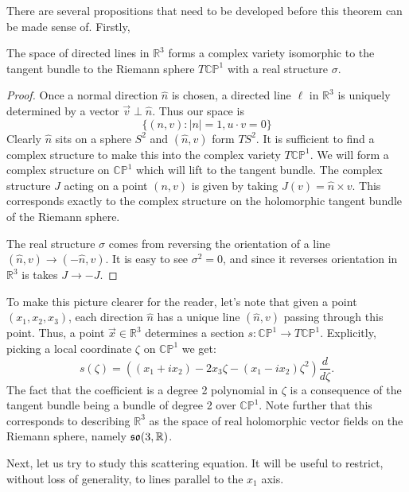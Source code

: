 	There are several propositions that need to be developed before this theorem can be made sense of. Firstly, 
	\begin{prop}
		The space of directed lines in $\mathbb R^3$ forms a complex variety isomorphic to the tangent bundle to the Riemann sphere $T \mathbb{CP}^1$ with a real structure $\sigma$.
	\end{prop}
	\begin{proof}
		Once a normal direction $\hat n$ is chosen, a directed line $\ell$ in $\mathbb R^3$ is uniquely determined by a vector $\vec v \perp \hat n$. Thus our space is
		\begin{equation}
			\{ (n, v) : |n| = 1, u \cdot v = 0\}
		\end{equation}
		Clearly $\hat n$ sits on a sphere $S^2$ and $(\hat n, v)$ form $T S^2$. It is sufficient to find a complex structure to make this into the complex variety $T \mathbb{CP}^1$. We will form a complex structure on $\mathbb{CP}^1$ which will lift to the tangent bundle. 
		The complex structure $J$ acting on a point $(n, v)$ is given by taking $J(v) = \hat n \times v$. This corresponds exactly to the complex structure on the holomorphic tangent bundle of the Riemann sphere.
		
		The real structure $\sigma$ comes from reversing the orientation of a line $(\hat n, v) \to (-\hat n, v)$. It is easy to see $\sigma^2 = 0$, and since it reverses orientation in $\mathbb R^3$ is takes $J \to -J$.
	\end{proof}
	\begin{eg}
		To make this picture clearer for the reader, let's note that given a point $(x_1, x_2, x_3)$, each direction $\hat n$ has a unique line $(\hat n, v)$ passing through this point.
		Thus, a point $\vec x \in \mathbb R^3$ determines a section $s: \mathbb{CP}^1 \to T\mathbb{CP}^1$. Explicitly, picking a local coordinate $\zeta$ on $\mathbb{CP}^1$ we get:
		\begin{equation}
			s(\zeta) = ((x_1 + i x_2) - 2x_3 \zeta - (x_1 - i x_2)\zeta^2) \frac{d}{d\zeta}.
		\end{equation}
		The fact that the coefficient is a degree 2 polynomial in $\zeta$ is a consequence of the tangent bundle being a bundle of degree 2 over $\mathbb{CP}^1$. Note further that this corresponds to describing $\mathbb R^3$ as the space of real holomorphic vector fields on the Riemann sphere, namely $\frak{so}(3, \mathbb R)$.
	\end{eg}

	Next, let us try to study this scattering equation. It will be useful to restrict, without loss of generality, to lines parallel to the $x_1$ axis. 
	
